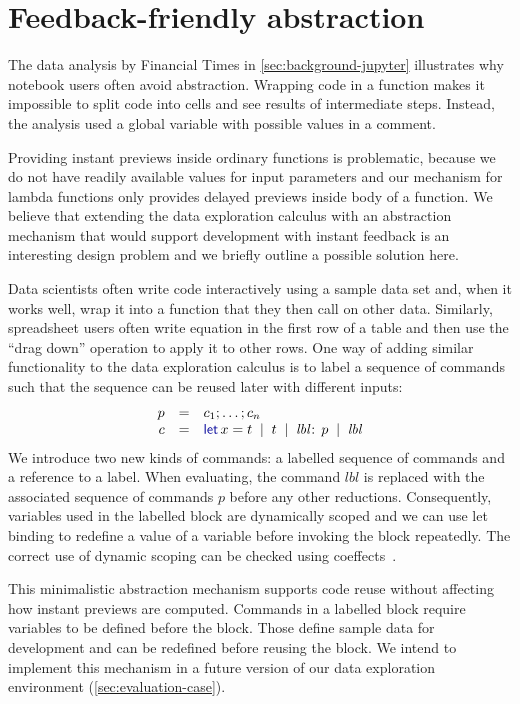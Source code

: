 \documentclass[english,crc,references=cleveref]{programming}
\theoremstyle{plain}
\theoremstyle{definition}
\newcommand{\lsep}{\;\;|\;\;}
\newcommand{\kvd}[1]{\textnormal{\textcolor{kvdclr}{\sffamily #1}}}
\begin{document}

\section{Feedback-friendly abstraction}
\label{sec:extra-abstraction}

The data analysis by Financial Times in \cref{sec:background-jupyter} illustrates why
notebook users often avoid abstraction. Wrapping code in a function makes it impossible to
split code into cells and see results of intermediate steps. Instead, the analysis used a
global variable with possible values in a comment.

Providing instant previews inside ordinary functions is problematic, because we do not have readily
available values for input parameters and our mechanism for lambda functions only provides
delayed previews inside body of a function. We believe that extending the data exploration calculus
with an abstraction mechanism that would support development with instant feedback is an
interesting design problem and we briefly outline a possible solution here.

Data scientists often write code interactively using a sample data set and, when it works well,
wrap it into a function that they then call on other data. Similarly, spreadsheet users
often write equation in the first row of a table and then use the ``drag down'' operation to
apply it to other rows. One way of adding similar functionality to the data exploration calculus
is to label a sequence of commands such that the sequence can be reused later with different
inputs:
%
\begin{equation*}
\begin{array}{rcl}
p &=& c_1; \ldots; c_n\\
c &=& \kvd{let}\,x=t \lsep t \lsep \textit{lbl}\!:\,p \lsep \textit{lbl}
\end{array}
\end{equation*}
%
%
We introduce two new kinds of commands: a labelled sequence of commands and a reference to a label.
When evaluating, the command $\textit{lbl}$ is replaced with the associated sequence of
commands $p$ before any other reductions. Consequently, variables used in the labelled block are
dynamically scoped and we can use let binding to redefine a value of a variable before invoking
the block repeatedly. The correct use of dynamic scoping can be checked using
coeffects~\cite{coeffects}.

This minimalistic abstraction mechanism supports code reuse without affecting how instant previews
are computed. Commands in a labelled block require variables to be defined before the block.
Those define sample data for development and can be redefined before reusing the block. We
intend to implement this mechanism in a future version of our data
exploration environment (\cref{sec:evaluation-case}).

\end{document}
